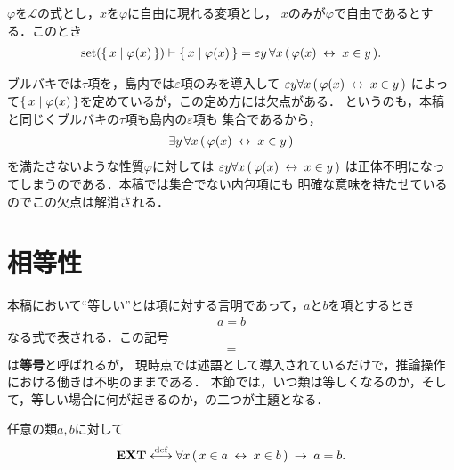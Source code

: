 	\begin{screen}
		\begin{thm}
			$\varphi$を$\mathcal{L}$の式とし，$x$を$\varphi$に自由に現れる変項とし，
			$x$のみが$\varphi$で自由であるとする．このとき
			\begin{align}
				\operatorname*{set} (\left\{\, x \mid \varphi(x)\, \right\}) \vdash \left\{\, x \mid \varphi(x)\, \right\} 
				= \varepsilon y\, \forall x\, (\, \varphi(x) \hspace{0.25em}\leftrightarrow\hspace{0.25em} x \in y\, ).
			\end{align}
		\end{thm}
	\end{screen}
	
	ブルバキ\cite{key4}では$\tau$項を，島内\cite{key6}では$\varepsilon$項のみを導入して
	$\varepsilon y \forall x\, (\, \varphi(x) \hspace{0.25em}\leftrightarrow\hspace{0.25em} x \in y\, )$
	によって$\left\{\, x \mid \varphi(x)\, \right\}$を定めているが，この定め方には欠点がある．
	というのも，本稿と同じくブルバキ\cite{key4}の$\tau$項も島内\cite{key6}の$\varepsilon$項も
	集合であるから，
	\begin{align}
		\exists y\, \forall x\, (\, \varphi(x) \hspace{0.25em}\leftrightarrow\hspace{0.25em} x \in y\, )
	\end{align}
	を満たさないような性質$\varphi$に対しては
	$\varepsilon y \forall x\, (\, \varphi(x) \hspace{0.25em}\leftrightarrow\hspace{0.25em} x \in y\, )$
	は正体不明になってしまうのである．本稿では集合でない内包項にも
	明確な意味を持たせているのでこの欠点は解消される．
	
\section{相等性}
	本稿において``等しい''とは項に対する言明であって，$a$と$b$を項とするとき
	\begin{align}
		a = b
	\end{align}
	なる式で表される．この記号
	\begin{align}
		=
	\end{align}
	は{\bf 等号}と呼ばれるが，
	現時点では述語として導入されているだけで，推論操作における働きは不明のままである．
	本節では，いつ類は等しくなるのか，そして，等しい場合に何が起きるのか，の二つが主題となる．
	
	\begin{screen}
		\begin{axm}
			任意の類$a,b$に対して
			\begin{align}
				\mbox{{\bf EXT}} \overset{\mathrm{def}}{\longleftrightarrow} \forall x\, (\, x \in a \hspace{0.25em}\leftrightarrow\hspace{0.25em} x \in b\, ) 
				\hspace{0.25em}\rightarrow\hspace{0.25em} a=b.
			\end{align}
		\end{axm}
	\end{screen}
	
